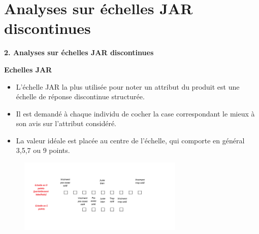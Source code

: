 \documentclass[aspectratio=169,xcolor=dvipsnames]{beamer}
\begin{document}
\section{Analyses sur échelles JAR discontinues}

\begin{frame}[plain]

\vfill

\begin{center}
{\huge \textcolor{nyubluedark}{\textbf{2. Analyses sur échelles JAR discontinues}}}
\end{center}

\vfill

\end{frame}

\begin{frame}
	\begin{block}{\textbf{Echelles JAR}}
		\begin{itemize}
		\item L'échelle JAR la plus utilisée pour noter un attribut du produit est une échelle de réponse discontinue structurée.
		\item Il est demandé à chaque individu de cocher la case correspondant le mieux à son avis sur l'attribut considéré.
		\item La valeur idéale est placée au centre de l'échelle, qui comporte en général 3,5,7 ou 9 points. 
		\end{itemize}
	\end{block}
	
	\begin{figure}
		\centering
		\includegraphics[width=0.7\textwidth]{expl_echelles_dis_JAR.png}
	\end{figure}
\end{frame}
\end{document}
